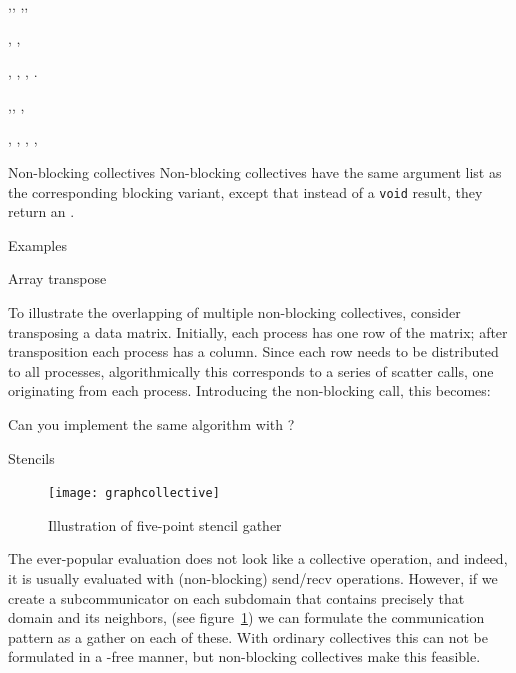 
,,
,,

, ,

,
,
,
.

,, ,

, ,
, ,

\begin{mplnote}{Non-blocking collectives}
  Non-blocking collectives have the same argument list as the
  corresponding blocking variant, except that
  instead of a \lstinline+void+ result,
  they return an .
\end{mplnote}

 {Examples}

 {Array transpose}

To illustrate the overlapping of multiple non-blocking collectives,
consider transposing a data matrix.
Initially, each process has one row of the matrix;
after transposition each process has a column.
Since each row needs to be distributed to all processes,
algorithmically this corresponds to a series of scatter calls,
one originating from each process.
%
%
Introducing the non-blocking  call,
this becomes:
%

\begin{exercise}
  Can you implement the same algorithm with ?
\end{exercise}


 {Stencils}

\begin{figure}[ht]
  \texttt{[image: graphcollective]}
  \caption{Illustration of five-point stencil gather}
  \label{fig:5ptcollective}
\end{figure}

The ever-popular  evaluation
does not look like a collective operation, and indeed,
it is usually evaluated with (non-blocking) send/recv operations.
However, if we create a subcommunicator on each subdomain
that contains precisely that domain and its neighbors,
(see figure~\ref{fig:5ptcollective})
we can formulate the communication pattern as a gather on each of these.
With ordinary collectives this can not be formulated in a -free
manner, but non-blocking collectives make this feasible.


